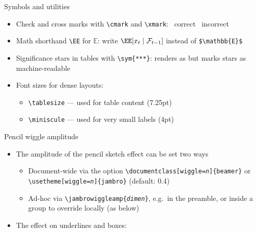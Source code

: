 \documentclass[10pt,itemsep]{beamer}
\begin{document}
\begin{frame}
    {Symbols and utilities}
    \begin{itemize}
        \item Check and cross marks with \texttt{\textbackslash cmark} and \texttt{\textbackslash xmark}: \quad \cmark\ correct \quad \xmark\ incorrect\bigskip
        \item Math shorthand \texttt{\textbackslash EE} for $\mathbb{E}$: write $\EE[x_t \mid \mathcal{F}_{t-1}]$ instead of \texttt{\$\textbackslash mathbb\{E\}\$}\bigskip
        \item Significance stars in tables with \texttt{\textbackslash sym\{***\}}: renders as \sym{***} but marks stars as machine-readable\bigskip
        \item Font sizes for dense layouts:
        \begin{itemize}
            \item \texttt{\textbackslash tablesize} --- {\tablesize used for table content (7.25pt)}
            \item \texttt{\textbackslash miniscule} --- {\miniscule used for very small labels (4pt)}
        \end{itemize}
    \end{itemize}
\end{frame}
\shownotesblock{}

\begin{frame}
    {Pencil wiggle amplitude}
    \begin{itemize}
        \item The amplitude of the pencil sketch effect can be set two ways
        \begin{itemize}
            \item Document-wide via the option \texttt{\textbackslash documentclass[wiggle=\textit{n}]\{beamer\}} or \texttt{\textbackslash usetheme[wiggle=\textit{n}]\{jambro\}} (default: 0.4)
            \item Ad-hoc via \texttt{\textbackslash jambrowiggleamp\{\textit{dimen}\}}, e.g.\ in the preamble, or inside a group to override locally (as below)
        \end{itemize}\bigskip
        \item The effect on underlines and boxes:
    \end{itemize}
    \begin{center}
        \jambrowiggleamp{0.2pt}%
         \quad {} \quad
    \end{center}
    \begin{center}
        \jambrowiggleamp{0.4pt}%
         \quad {} \quad
    \end{center}
    \begin{center}
        \jambrowiggleamp{2.5pt}%
         \quad {} \quad
    \end{center}
\end{frame}
\shownotesblock{}
\end{document}
